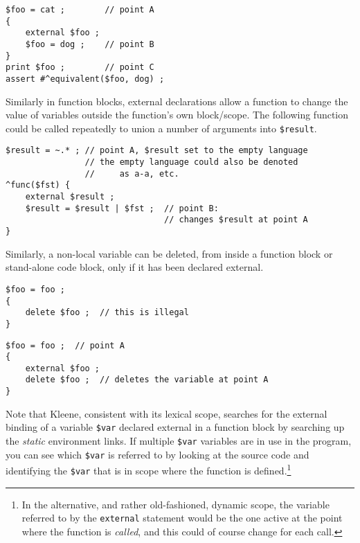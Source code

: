 \begin{samepage}
\begin{Verbatim}
$foo = cat ;        // point A
{
    external $foo ; 
    $foo = dog ;    // point B
}
print $foo ;        // point C
assert #^equivalent($foo, dog) ;
\end{Verbatim}
\end{samepage}

\noindent
Similarly in function blocks, external declarations allow a function to change the value
of variables outside the function's own block/scope.  The following function could be
called repeatedly to union a number of arguments into \verb!$result!.

\begin{samepage}
\begin{Verbatim}
$result = ~.* ; // point A, $result set to the empty language
                // the empty language could also be denoted 
                //     as a-a, etc.
^func($fst) {
    external $result ;
    $result = $result | $fst ;  // point B: 
                                // changes $result at point A
}
\end{Verbatim}
\end{samepage}

\noindent
Similarly, a non-local variable can be deleted, from inside a
function block or stand-alone code block, only if it has been
declared external.

\begin{samepage}
\begin{Verbatim}
$foo = foo ;
{
    delete $foo ;  // this is illegal
}
\end{Verbatim}
\end{samepage}

\begin{samepage}
\begin{Verbatim}
$foo = foo ;  // point A
{
    external $foo ;
    delete $foo ;  // deletes the variable at point A
}
\end{Verbatim}
\end{samepage}

Note that Kleene, consistent with its lexical scope, searches for
the external binding of a variable \verb!$var! declared external in
a function block by
searching up the \emph{static} environment links.  If multiple
\verb!$var! variables are in use in the program, you can see
which \verb!$var! is referred to by
looking at the source code and identifying the \verb!$var! that
is in scope where the function is defined.\footnote{In the
alternative, and rather old-fashioned, dynamic scope, the variable
referred to by the \texttt{external} statement would be the one
active at the point where the function is \emph{called}, and this
could of course change for each call.}

